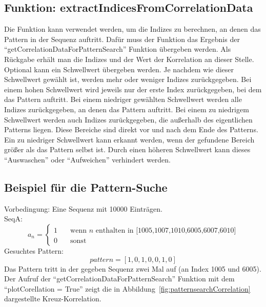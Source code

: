 \subsection{Funktion: extractIndicesFromCorrelationData}
Die Funktion kann verwendet werden, um die Indizes zu berechnen, an denen das Pattern in der Sequenz auftritt. Dafür muss der Funktion das Ergebnis der \enquote{getCorrelationDataForPatternSearch} Funktion
übergeben werden. Als Rückgabe erhält man die Indizes und der Wert der Korrelation an dieser Stelle.\\
Optional kann ein Schwellwert übergeben werden. Je nachdem wie dieser Schwellwert gewählt ist, werden mehr oder weniger Indizes zurückgegeben. Bei einem hohen Schwellwert wird 
jeweils nur der erste Index zurückgegeben, bei dem das Pattern auftritt. Bei einem niedriger gewählten Schwellwert werden alle Indizes zurückgegeben, an denen das Pattern auftritt. 
Bei einem zu niedrigem Schwellwert werden auch Indizes zurückgegeben, die außerhalb des eigentlichen Patterns liegen. Diese Bereiche sind direkt vor und nach dem Ende des Patterns. Ein zu niedriger Schwellwert kann erkannt werden, wenn der gefundene Bereich größer als das Pattern selbst ist. Durch einen höheren Schwellwert kann dieses \enquote{Auswaschen} oder \enquote{Aufweichen} verhindert werden.

\subsection{Beispiel für die Pattern-Suche}
Vorbedingung: Eine Sequenz mit 10000 Einträgen. \\
SeqA:
\[ a_{n} =
  \begin{cases}
    1       & \quad \text{wenn } n \text{ enthalten in [1005,1007,1010,6005,6007,6010]}\\
    0  & \quad \text{sonst}
  \end{cases}
\]
Gesuchtes Pattern:
\[
pattern = [1,0,1,0,0,1,0] 
\]
Das Pattern tritt in der gegeben Sequenz zwei Mal auf (an Index 1005 und 6005).
Der Aufruf der \enquote{getCorrelationDataForPatternSearch} Funktion mit dem \enquote{plotCorellation = True} zeigt die in Abbildung~\ref{fig:patternsearchCorrelation} dargestellte Kreuz-Korrelation.

